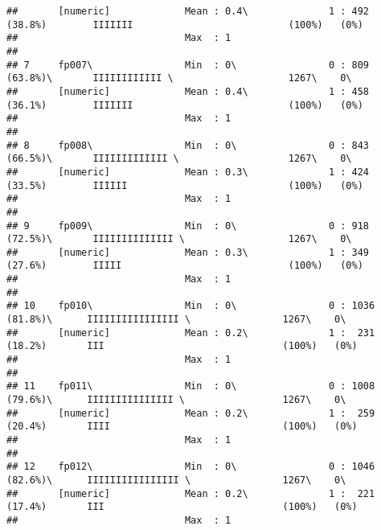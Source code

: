 \documentclass[]{article}
\begin{document}
\begin{verbatim}
##       [numeric]             Mean : 0.4\              1 : 492 (38.8%)        IIIIIII                           (100%)   (0%)     
##                             Max  : 1                                                                                            
## 
## 7     fp007\                Min  : 0\                0 : 809 (63.8%)\       IIIIIIIIIIII \                    1267\    0\       
##       [numeric]             Mean : 0.4\              1 : 458 (36.1%)        IIIIIII                           (100%)   (0%)     
##                             Max  : 1                                                                                            
## 
## 8     fp008\                Min  : 0\                0 : 843 (66.5%)\       IIIIIIIIIIIII \                   1267\    0\       
##       [numeric]             Mean : 0.3\              1 : 424 (33.5%)        IIIIII                            (100%)   (0%)     
##                             Max  : 1                                                                                            
## 
## 9     fp009\                Min  : 0\                0 : 918 (72.5%)\       IIIIIIIIIIIIII \                  1267\    0\       
##       [numeric]             Mean : 0.3\              1 : 349 (27.6%)        IIIII                             (100%)   (0%)     
##                             Max  : 1                                                                                            
## 
## 10    fp010\                Min  : 0\                0 : 1036 (81.8%)\      IIIIIIIIIIIIIIII \                1267\    0\       
##       [numeric]             Mean : 0.2\              1 :  231 (18.2%)       III                               (100%)   (0%)     
##                             Max  : 1                                                                                            
## 
## 11    fp011\                Min  : 0\                0 : 1008 (79.6%)\      IIIIIIIIIIIIIII \                 1267\    0\       
##       [numeric]             Mean : 0.2\              1 :  259 (20.4%)       IIII                              (100%)   (0%)     
##                             Max  : 1                                                                                            
## 
## 12    fp012\                Min  : 0\                0 : 1046 (82.6%)\      IIIIIIIIIIIIIIII \                1267\    0\       
##       [numeric]             Mean : 0.2\              1 :  221 (17.4%)       III                               (100%)   (0%)     
##                             Max  : 1                                                                                            

\end{verbatim}
\end{document}
